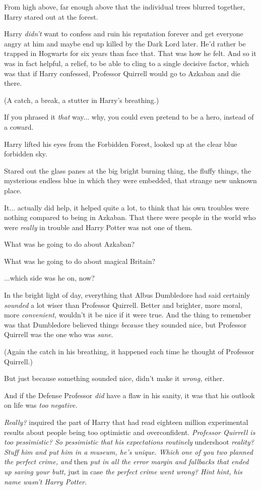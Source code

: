 From high above, far enough above that the individual trees blurred
together, Harry stared out at the forest.

Harry \emph{didn't} want to confess and ruin his reputation forever and
get everyone angry at him and maybe end up killed by the Dark Lord
later. He'd rather be trapped in Hogwarts for six years than face that.
That was how he felt. And so it was in fact helpful, a relief, to be
able to cling to a single decisive factor, which was that if Harry
confessed, Professor Quirrell would go to Azkaban and die there.

(A catch, a break, a stutter in Harry's breathing.)

If you phrased it \emph{that} way... why, you could even pretend to
be a hero, instead of a coward.

Harry lifted his eyes from the Forbidden Forest, looked up at the clear
blue forbidden sky.

Stared out the glass panes at the big bright burning thing, the fluffy
things, the mysterious endless blue in which they were embedded, that
strange new unknown place.

It... actually did help, it helped quite a lot, to think that his
own troubles were nothing compared to being in Azkaban. That there were
people in the world who were \emph{really} in trouble and Harry Potter
was not one of them.

What was he going to do about Azkaban?

What was he going to do about magical Britain?

...which side was he on, now?

In the bright light of day, everything that Albus Dumbledore had said
certainly \emph{sounded} a lot wiser than Professor Quirrell. Better and
brighter, more moral, more \emph{convenient,} wouldn't it be nice if it
were true. And the thing to remember was that Dumbledore believed things
\emph{because} they sounded nice, but Professor Quirrell was the one who
was \emph{sane}.

(Again the catch in his breathing, it happened each time he thought of
Professor Quirrell.)

But just because something sounded nice, didn't make it \emph{wrong,}
either.

And if the Defense Professor \emph{did} have a flaw in his sanity, it
was that his outlook on life was \emph{too negative.}

\emph{Really?} inquired the part of Harry that had read eighteen million
experimental results about people being too optimistic and
overconfident. \emph{Professor Quirrell is too pessimistic? So
pessimistic that his expectations routinely} undershoot \emph{reality?
Stuff him and put him in a museum, he's unique. Which one of you two
planned the perfect crime, and} then \emph{put in all the error margin
and fallbacks that ended up saving your butt,} just in case \emph{the
perfect crime went wrong? Hint hint, his name wasn't Harry Potter.}

